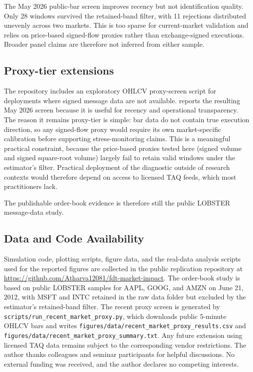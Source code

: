 \documentclass[11pt]{article}
\newcommand{\REV}{}
\begin{document}
The May 2026 public-bar screen improves recency but not identification quality. Only 28 windows survived the retained-band filter, with 11 rejections distributed unevenly across two markets. This is too sparse for current-market validation and relies on price-based signed-flow proxies rather than exchange-signed executions. Broader panel claims are therefore not inferred from either sample.

\subsection{Proxy-tier extensions}
\REV
The repository includes an exploratory OHLCV proxy-screen script for deployments where signed message data are not available.  reports the resulting May 2026 screen because it is useful for recency and operational transparency. The reason it remains proxy-tier is simple: bar data do not contain true execution direction, so any signed-flow proxy would require its own market-specific calibration before supporting stress-monitoring claims. This is a meaningful practical constraint, because the price-based proxies tested here (signed volume and signed square-root volume) largely fail to retain valid windows under the estimator's filter. Practical deployment of the diagnostic outside of research contexts would therefore depend on access to licensed TAQ feeds, which most practitioners lack.

The publishable order-book evidence is therefore still the public LOBSTER message-data study.

\subsection{Data and Code Availability}
Simulation code, plotting scripts, figure data, and the real-data analysis scripts used for the reported figures are collected in the public replication repository at \url{https://github.com/Atharva12081/fdt-market-impact}. The order-book study is based on public LOBSTER samples for AAPL, GOOG, and AMZN on June 21, 2012, with MSFT and INTC retained in the raw data folder but excluded by the estimator's retained-band filter. The recent proxy screen is generated by \texttt{scripts/run\_recent\_market\_proxy.py}, which downloads public 5-minute OHLCV bars and writes \texttt{figures/data/recent\_market\_proxy\_results.csv} and \texttt{figures/data/recent\_market\_proxy\_summary.txt}. Any future extension using licensed TAQ data remains subject to the corresponding vendor restrictions. The author thanks colleagues and seminar participants for helpful discussions. No external funding was received, and the author declares no competing interests.
\end{document}
